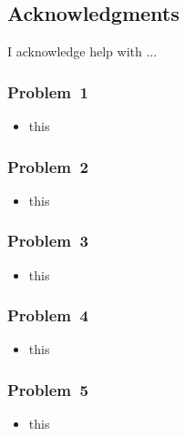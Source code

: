 
\newpage\clearpage
\subsection*{Acknowledgments}

I acknowledge help with ...

\subsubsection*{Problem~1}
\begin{itemize}
\item this
\end{itemize}

\subsubsection*{Problem~2}
\begin{itemize}
\item this
\end{itemize}

\subsubsection*{Problem~3}
\begin{itemize}
\item this
\end{itemize}

\subsubsection*{Problem~4}
\begin{itemize}
\item this
\end{itemize}

\subsubsection*{Problem~5}
\begin{itemize}
\item this
\end{itemize}
